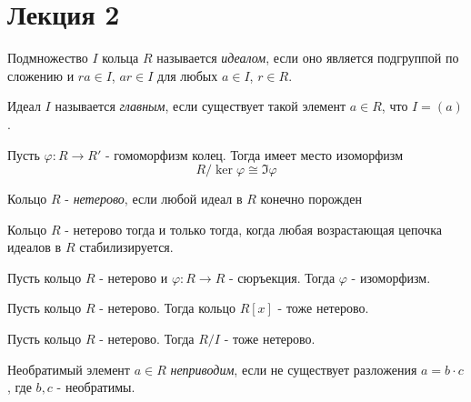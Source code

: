 \documentclass{article}
\begin{document}
\section*{Лекция 2}

\begin{definition}
    Подмножество $I$ кольца $R$ называется \textit{идеалом},
    если оно является подгруппой по сложению и
    $ra \in I$, $ar \in I$ для любых $a \in I$, $r \in R$.
\end{definition}

\begin{definition}
    Идеал $I$ называется \textit{главным}, если существует
    такой элемент $a \in R$, что $I = (a)$.
\end{definition}

\begin{theorem}
    Пусть $\varphi : R \to R'$ - гомоморфизм колец.
    Тогда имеет место изоморфизм
    $$R / \ker \varphi \cong \Im \varphi$$
\end{theorem}

\begin{definition}
    Кольцо $R$ - \textit{нетерово}, если любой идеал в $R$
    конечно порожден
\end{definition}

\begin{theorem}
    Кольцо $R$ - нетерово тогда и только тогда, когда
    любая возрастающая цепочка идеалов в $R$ стабилизируется.
\end{theorem}

\begin{theorem}
    Пусть кольцо $R$ - нетерово и $\varphi : R \to R$
    - сюръекция. Тогда $\varphi$ - изоморфизм.
\end{theorem}

\begin{theorem}
    Пусть кольцо $R$ - нетерово. Тогда кольцо
    $R[x]$ - тоже нетерово.
\end{theorem}

\begin{theorem}
    Пусть кольцо $R$ - нетерово. Тогда $R / I$ - тоже нетерово.
\end{theorem}

\begin{definition}
    Необратимый элемент $a \in R$ \textit{неприводим}, если не существует
    разложения $a = b \cdot c$, где $b, c$ - необратимы.
\end{definition}
\end{document}
